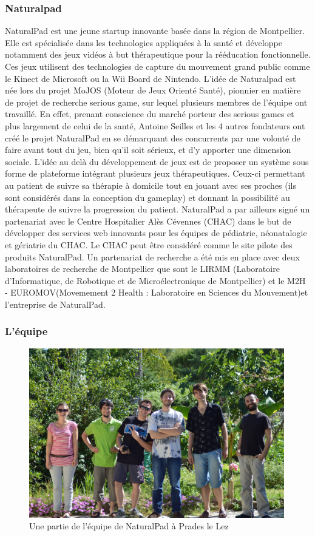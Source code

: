	\subsubsection{Naturalpad}
NaturalPad est une jeune startup innovante basée dans la région de Montpellier. Elle est spécialisée dans les technologies appliquées à la santé et développe notamment des jeux vidéos à but thérapeutique pour la rééducation fonctionnelle. Ces jeux utilisent des technologies de capture du mouvement grand public comme le Kinect de Microsoft ou la Wii Board de Nintendo. L’idée de Naturalpad est née lors du projet MoJOS (Moteur de Jeux Orienté Santé), pionnier en matière de projet de recherche serious game, sur lequel plusieurs membres de l’équipe ont travaillé. En effet, prenant conscience du marché porteur des serious games et plus largement de celui de la santé, Antoine Seilles et les 4 autres fondateurs ont créé le projet NaturalPad en se démarquant des concurrents par une volonté de faire avant tout du jeu, bien qu’il soit sérieux, et d’y apporter une dimension sociale. L’idée au delà du développement de jeux est de proposer un système sous forme de plateforme intégrant plusieurs jeux thérapeutiques. Ceux-ci permettant au patient de suivre sa thérapie à domicile tout en jouant avec ses proches (ils sont considérés dans la conception du gameplay) et donnant la possibilité au thérapeute de suivre la progression du patient. NaturalPad a par ailleurs signé un partenariat avec le Centre Hospitalier Alès Cévennes (CHAC) dans le but de développer des services web innovants pour les équipes de pédiatrie, néonatalogie et gériatrie du CHAC. Le CHAC peut être considéré comme le site pilote des produits NaturalPad. Un partenariat de recherche a été mis en place avec deux laboratoires de recherche de Montpellier que sont le LIRMM (Laboratoire d’Informatique, de Robotique et de Microélectronique de Montpellier) et le M2H - EUROMOV(Movemement 2 Health : Laboratoire en Sciences du Mouvement)et l'entreprise de NaturalPad.

	\subsubsection{L'équipe}
	\begin{figure}[!h] 
		\centering
		\includegraphics[width=420px]{images/naturalpad_groupe.jpg}
		\caption{Une partie de l'équipe de NaturalPad à Prades le Lez}
		\label{naturalpad_groupe}
	\end{figure}
	
